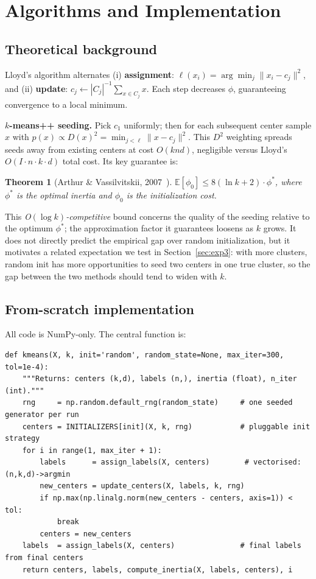 \documentclass[11pt,a4paper]{article}
\newtheorem{theorem}{Theorem}
\newcommand{\EE}{\mathbb{E}}
\newcommand{\norm}[1]{\lVert #1 \rVert}
\begin{document}
\section{Algorithms and Implementation}

\subsection{Theoretical background}

Lloyd's algorithm alternates (i) \textbf{assignment}: $\ell(x_i)=\arg\min_j\norm{x_i-c_j}^2$,
and (ii) \textbf{update}: $c_j\leftarrow|C_j|^{-1}\!\sum_{x\in C_j}\!x$. Each step
decreases $\phi$, guaranteeing convergence to a local minimum.

\textbf{$k$-means++ seeding.} Pick $c_1$ uniformly; then for each subsequent center
sample $x$ with $p(x)\propto D(x)^2=\min_{j<\ell}\norm{x-c_j}^2$. This $D^2$ weighting
spreads seeds away from existing centers at cost $O(knd)$, negligible versus Lloyd's
$O(I \cdot n \cdot k \cdot d)$ total cost. Its key guarantee is:
\begin{theorem}[Arthur \& Vassilvitskii, 2007~{\normalfont[1]}]
  $\EE[\phi_0]\leq 8(\ln k+2)\cdot\phi^*$,
  where $\phi^*$ is the optimal inertia and $\phi_0$ is the initialization cost.
\end{theorem}
This \emph{O$(\log k)$-competitive} bound concerns the quality of the seeding relative
to the optimum $\phi^*$; the approximation factor it guarantees loosens as $k$ grows.
It does not directly predict the empirical gap over random initialization, but it
motivates a related expectation we test in Section~\ref{sec:exp3}: with more clusters,
random init has more opportunities to seed two centers in one true cluster, so the gap
between the two methods should tend to widen with $k$.

\subsection{From-scratch implementation}

All code is NumPy-only. The central function is:
\begin{lstlisting}
def kmeans(X, k, init='random', random_state=None, max_iter=300, tol=1e-4):
    """Returns: centers (k,d), labels (n,), inertia (float), n_iter (int)."""
    rng     = np.random.default_rng(random_state)     # one seeded generator per run
    centers = INITIALIZERS[init](X, k, rng)           # pluggable init strategy
    for i in range(1, max_iter + 1):
        labels      = assign_labels(X, centers)        # vectorised: (n,k,d)->argmin
        new_centers = update_centers(X, labels, k, rng)
        if np.max(np.linalg.norm(new_centers - centers, axis=1)) < tol:
            break
        centers = new_centers
    labels  = assign_labels(X, centers)               # final labels from final centers
    return centers, labels, compute_inertia(X, labels, centers), i
\end{lstlisting}
\end{document}
